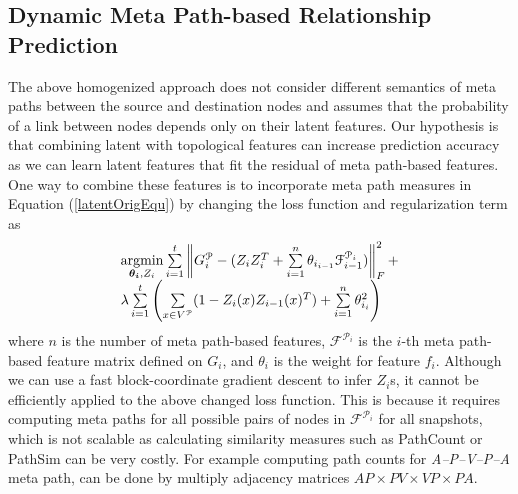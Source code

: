 \subsection{Dynamic Meta Path-based Relationship Prediction}

The above homogenized approach does not consider different semantics of meta paths between the source and destination nodes and assumes that the probability of a link between nodes depends only on their latent features. %
Our hypothesis is that combining latent with topological features can increase prediction accuracy as we can learn latent features that fit the residual of meta path-based features. One way to combine these features is to incorporate meta path measures in Equation (\ref{latentOrigEqu}) by changing the loss function and regularization term as
\begin{equation}\label{latentMetaEqu}
    \begin{array}{l}
\operatorname*{argmin}\limits_{\boldsymbol{\theta_i},Z_i}\sum\limits_{i=1}^{t}\left \| G^\mathcal{P}_i - (Z_{i}Z_{i}^T + \sum\limits_{i=1}^{n}\theta_{i_{i-1}} \mathcal{F}^{\mathcal{P}_i}_{i-1}) \right \|^2_F+
\\ 
\lambda \sum\limits_{i=1}^{t}\left(\sum\limits_{x \in V^\mathcal{P}}(1-Z_{i}(x)Z_{i-1}(x)^T) + \sum\limits_{i=1}^{n} \theta_{i_i}^2\right)\\
    \end{array}
\end{equation}
where $n$ is the number of meta path-based features, $\mathcal{F}^{\mathcal{P}_i}$ is the $i$-th meta path-based feature matrix defined on $G_i$, and $\theta_i$ is the weight for feature $f_i$. Although we can use a fast block-coordinate gradient descent \cite{Zhu2016} to infer $Z_i$s, it cannot be efficiently applied to the above changed loss function. This is because it requires computing meta paths for all possible pairs of nodes in $\mathcal{F}^{\mathcal{P}_i}$ for all snapshots, which is not scalable as calculating similarity measures such as PathCount or PathSim can be very costly. For example computing path counts for \textit{A--P--V--P--A} meta path, can be done by multiply adjacency matrices $AP\times PV\times VP\times PA$. 


